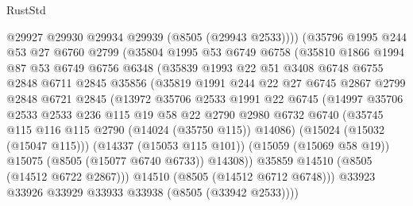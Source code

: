 \begin{lexlean}{RustStd}
\begin{coremodule}
                  @29927
                  @29930
                  @29934
                  @29939
                  (@8505 (@29943 @2533))))
              (@35796
                @1995
                @244
                @53
                @27
                @6760
                @2799
                (@35804
                  @1995
                  @53
                  @6749
                  @6758
                  (@35810
                    @1866
                    @1994
                    @87
                    @53
                    @6749
                    @6756
                    @6348
                    (@35839
                      @1993
                      @22
                      @51
                      @3408
                      @6748
                      @6755
                      @2848
                      @6711
                      @2845
                      @35856
                      (@35819
                        @1991
                        @244
                        @22
                        @27
                        @6745
                        @2867
                        @2799
                        @2848
                        @6721
                        @2845
                        (@13972
                          @35706
                          @2533
                          @1991
                          @22
                          @6745
                          (@14997
                            @35706
                            @2533
                            @2533
                            @236
                            @115
                            @19
                            @58
                            @22
                            @2790
                            @2980
                            @6732
                            @6740
                            (@35745 @115 @116 @115 @2790 (@14024 (@35750 @115)) @14086)
                            (@15024 (@15032 (@15047 @115)))
                            (@14337 (@15053 @115 @101))
                            (@15059 (@15069 @58 @19))
                            @15075
                            (@8505 (@15077 @6740 @6733))
                            @14308))
                        @35859
                        @14510
                        (@8505 (@14512 @6722 @2867)))
                      @14510
                      (@8505 (@14512 @6712 @6748)))
                    @33923
                    @33926
                    @33929
                    @33933
                    @33938
                    (@8505 (@33942 @2533))))

\end{coremodule}
\end{lexlean}
